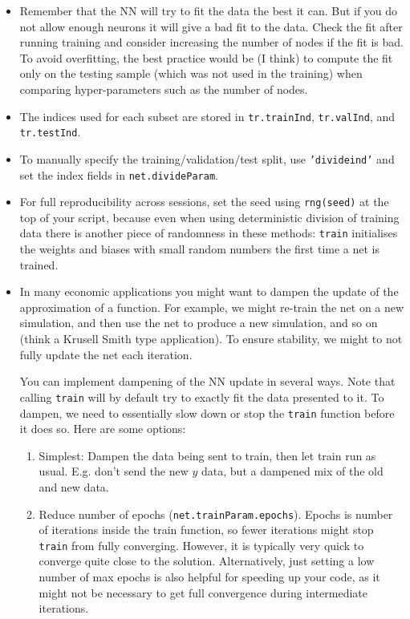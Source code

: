 \documentclass[a4paper,12pt]{article}
\newcommand{\code}[1]{\texttt{#1}}
\begin{document}
\begin{itemize}
\item Remember that the NN will try to fit the data the best it can. But if you do not allow enough neurons it will give a bad fit to the data. Check the fit after running training and consider increasing the number of nodes if the fit is bad. To avoid overfitting, the best practice would be (I think) to compute the fit only on the testing sample (which was not used in the training) when comparing hyper-parameters such as the number of nodes. 

  \item The indices used for each subset are stored in \code{tr.trainInd}, \code{tr.valInd}, and \code{tr.testInd}.
  \item To manually specify the training/validation/test split, use \code{'divideind'} and set the index fields in \code{net.divideParam}.
  \item For full reproducibility across sessions, set the seed using \code{rng(seed)} at the top of your script, because even when using deterministic division of training data there is another piece of randomness in these methods: \code{train} initialises the weights and biases with small random numbers the first time a net is trained. 



\item In many economic applications you might want to dampen the update of the approximation of a function. For example, we might re-train the net on a new simulation, and then use the net to produce a new simulation, and so on (think a Krusell Smith type application). To ensure stability, we might to not fully update the net each iteration. 

You can implement dampening of the NN update in several ways. Note that calling \code{train} will by default try to exactly fit the data presented to it. To dampen, we need to essentially slow down or stop the \code{train} function before it does so. Here are some options:
\begin{enumerate}
\item Simplest: Dampen the data being sent to train, then let train run as usual. E.g. don't send the new $y$ data, but a dampened mix of the old and new data. 

\item Reduce number of epochs (\code{net.trainParam.epochs}). Epochs is number of iterations inside the train function, so fewer iterations might stop \code{train} from fully converging. However, it is typically very quick to converge quite close to the solution. Alternatively, just setting a low number of max epochs is also helpful for speeding up your code, as it might not be necessary to get full convergence during intermediate iterations. 


\end{enumerate}
\end{itemize}
\end{document}
